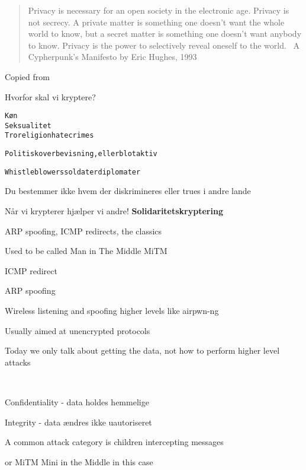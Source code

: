 \documentclass[Screen16to9,17pt]{foils}
\begin{document}
\begin{quote}
	Privacy is necessary for an open society in the electronic age. Privacy is not secrecy. A private matter is something one doesn't want the whole world to know, but a secret matter is something one doesn't want anybody to know. Privacy is the power to selectively reveal oneself to the world. ~A Cypherpunk's Manifesto by Eric Hughes, 1993
\end{quote}

Copied from 



Hvorfor skal vi kryptere?

\begin{alltt}
       Køn
                       Seksualitet
 Tro religion       hatecrimes

 Politisk overbevisning, eller blot aktiv

 Whistleblowers             soldater      diplomater
\end{alltt}

\centerline{Du bestemmer ikke hvem der diskrimineres eller trues i andre lande}

\vskip2cm

Når vi krypterer hjælper vi andre! {\bf Solidaritetskryptering}




\begin{list1}
\item ARP spoofing, ICMP redirects, the classics
\item Used to be called Man in The Middle MiTM
\begin{list2}
\item ICMP redirect
\item ARP spoofing
\item Wireless listening and spoofing higher levels like  airpwn-ng 
\end{list2}
\item Usually aimed at unencrypted protocols
\item Today we only talk about getting the data, not how to perform higher level attacks
\end{list1}


{~}

\begin{list2}
\item Confidentiality - data holdes hemmelige
\item Integrity - data ændres ikke uautoriseret
\item A common attack category is children intercepting messages
\item or MiTM Mini in the Middle in this case
\end{list2}
\end{document}

